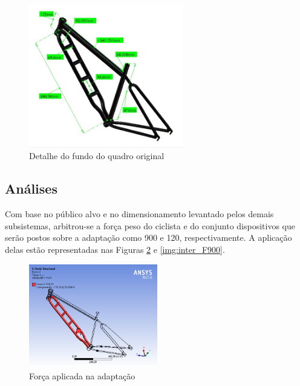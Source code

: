 	
	\graphicspath{{figuras/}}
	\begin{figure}[H]
		\centering
		\includegraphics[width=0.6\textwidth]{inter_cotas.jpg}
		\caption{Detalhe do fundo do quadro original}
		\label{img:inter_cotas}
	\end{figure}
	
	\subsection{Análises}
	
	Com base no público alvo e no dimensionamento levantado pelos demais subsistemas, arbitrou-se a força peso do ciclista e do conjunto dispositivos que serão postos sobre a adaptação como 900 e 120, respectivamente. A aplicação delas estão representadas nas Figuras \ref{img:inter_F120} e \ref{img:inter_F900}. 
	
	
	\begin{figure}[!htb]
		\centering
		\includegraphics[width=0.5\textwidth]{inter_F120.png}
		\caption{Força aplicada na adaptação}
		\label{img:inter_F120}
	\end{figure}
	
